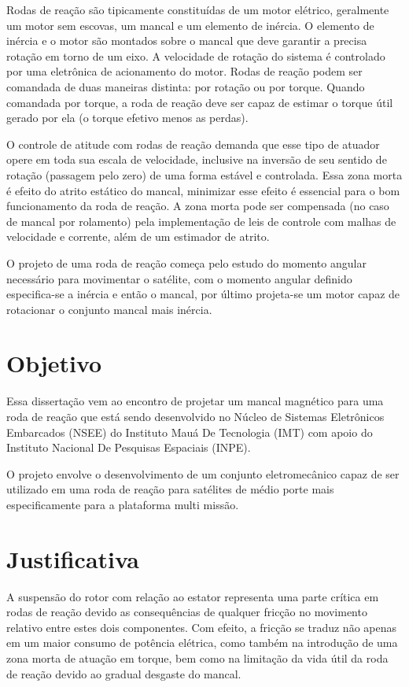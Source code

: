 Rodas de reação são tipicamente constituídas de um motor elétrico, geralmente um motor sem escovas, um mancal e um elemento de inércia.  O elemento de inércia e o motor são montados sobre o mancal que deve garantir a  precisa rotação em torno de um eixo. A velocidade de rotação do sistema é controlado por uma eletrônica de acionamento do motor. Rodas de reação podem ser comandada de duas maneiras distinta: por rotação ou por torque. Quando comandada por torque, a roda de reação deve ser capaz de estimar o torque útil gerado por ela (o torque efetivo menos as perdas). 

O controle de atitude  com rodas de reação demanda que esse tipo de  atuador opere em toda sua escala de velocidade, inclusive na inversão de seu sentido de rotação (passagem pelo zero) de uma forma estável e controlada. Essa zona morta é efeito do atrito estático do mancal, minimizar esse efeito é essencial para o bom funcionamento da roda de reação. A zona morta pode ser compensada (no caso de mancal por rolamento) pela implementação de leis de controle com malhas de velocidade e corrente, além de um estimador de atrito.

O projeto de uma roda de reação começa pelo estudo do momento angular necessário para movimentar o satélite, com o momento angular definido especifica-se a inércia e então o mancal, por último projeta-se um motor capaz de rotacionar o conjunto mancal mais inércia.


\section{Objetivo}

Essa dissertação vem ao encontro de projetar um mancal magnético para uma roda de reação que está sendo desenvolvido no Núcleo de Sistemas Eletrônicos Embarcados (NSEE) do Instituto Mauá De Tecnologia (IMT) com apoio do Instituto Nacional De Pesquisas Espaciais (INPE).

O projeto envolve o desenvolvimento de um conjunto eletromecânico capaz de ser utilizado em uma roda de reação para satélites de médio porte mais especificamente para a plataforma multi missão.


\section{Justificativa}

A suspensão do rotor com relação ao estator representa uma parte crítica em rodas de reação \citep{taniwaki2003experimental} devido as consequências de qualquer fricção no movimento relativo entre estes dois componentes. Com efeito, a fricção se traduz não apenas em um maior consumo de potência elétrica, como também na introdução de uma zona morta de atuação em torque, bem como na limitação da vida útil da roda de reação devido ao gradual desgaste do mancal.

